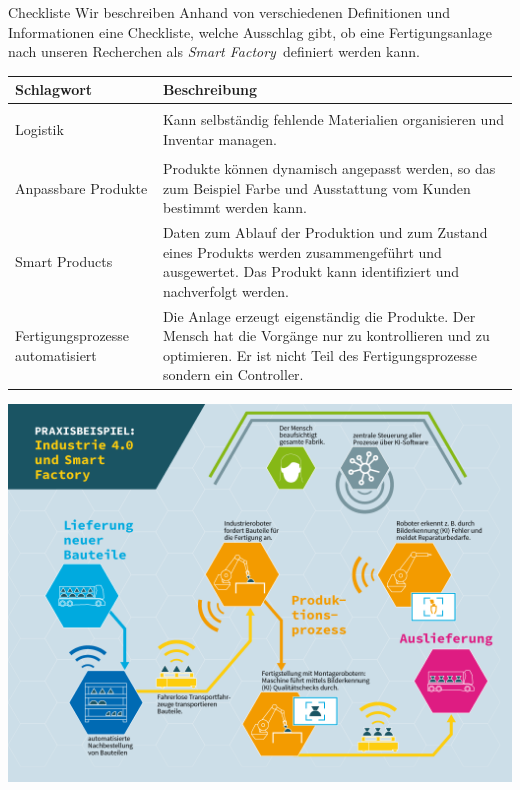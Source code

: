 \documentclass{article}
\def\SmartFactory{\textcolor{DarkestGray}{\textit{Smart Factory}}}
\begin{document}
\begin{Map}{Checkliste}\label{map:CheckListe}
Wir beschreiben Anhand von verschiedenen Definitionen und Informationen eine Checkliste, welche Ausschlag gibt, ob eine Fertigungsanlage nach unseren Recherchen als \SmartFactory\ definiert werden kann.

\begin{tabular}{p{2.5cm}p{8cm}}\toprule
	Schlagwort 
	& Beschreibung \\\midrule
	
	\hypertarget{CheckListe:Logistik}{Logistik}
	& Kann selbständig fehlende Materialien organisieren und Inventar managen.\cite{WasIndustrie40} \\\midrule
	
	\hypertarget{CheckListe:AnpassbareProdukte}{Anpassbare Produkte}
	& Produkte können dynamisch angepasst werden, so das zum Beispiel Farbe und Ausstattung vom Kunden bestimmt werden kann.\cite{WasIndustrie40} \\\midrule
	
	\hypertarget{CheckListe:SmartProduct}{Smart Products}
	& Daten zum Ablauf der Produktion und zum Zustand eines Produkts werden zusammengeführt und ausgewertet. Das Produkt kann identifiziert und nachverfolgt werden. \cite{Industrie40TippsUmsetzung} \\\midrule
	
	\hypertarget{CheckListe:Fertigungsprozess}{Fertigungsprozesse automatisiert}
	& Die Anlage erzeugt eigenständig die Produkte. Der Mensch hat die Vorgänge nur zu kontrollieren und zu optimieren. Er ist nicht Teil des Fertigungsprozesse sondern ein Controller.\cite{REFA}\\\bottomrule
	
\end{tabular}
\Block{}
\includegraphics[scale=0.33]{grafik}
\end{Map}
\end{document}
